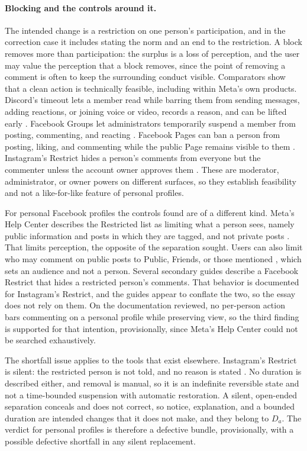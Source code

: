 \paragraph{Blocking and the controls around it.} The intended change is a restriction on one person's participation, and in the correction case it includes stating the norm and an end to the restriction. A block removes more than participation: the surplus is a loss of perception, and the user may value the perception that a block removes, since the point of removing a comment is often to keep the surrounding conduct visible. Comparators show that a clean action is technically feasible, including within Meta's own products. Discord's timeout lets a member read while barring them from sending messages, adding reactions, or joining voice or video, records a reason, and can be lifted early \cite{discord-timeout}. Facebook Groups let administrators temporarily suspend a member from posting, commenting, and reacting \cite{fb-groups}. Facebook Pages can ban a person from posting, liking, and commenting while the public Page remains visible to them \cite{page-ban}. Instagram's Restrict hides a person's comments from everyone but the commenter unless the account owner approves them \cite{ig-restrict}. These are moderator, administrator, or owner powers on different surfaces, so they establish feasibility and not a like-for-like feature of personal profiles.

For personal Facebook profiles the controls found are of a different kind. Meta's Help Center describes the Restricted list as limiting what a person sees, namely public information and posts in which they are tagged, and not private posts \cite{fb-restricted}. That limits perception, the opposite of the separation sought. Users can also limit who may comment on public posts to Public, Friends, or those mentioned \cite{fb-comments}, which sets an audience and not a person. Several secondary guides describe a Facebook Restrict that hides a restricted person's comments. That behavior is documented for Instagram's Restrict, and the guides appear to conflate the two, so the essay does not rely on them. On the documentation reviewed, no per-person action bars commenting on a personal profile while preserving view, so the third finding is supported for that intention, provisionally, since Meta's Help Center could not be searched exhaustively.

The shortfall issue applies to the tools that exist elsewhere. Instagram's Restrict is silent: the restricted person is not told, and no reason is stated \cite{ig-restrict}. No duration is described either, and removal is manual, so it is an indefinite reversible state and not a time-bounded suspension with automatic restoration. A silent, open-ended separation conceals and does not correct, so notice, explanation, and a bounded duration are intended changes that it does not make, and they belong to $D_a$. The verdict for personal profiles is therefore a defective bundle, provisionally, with a possible defective shortfall in any silent replacement.


